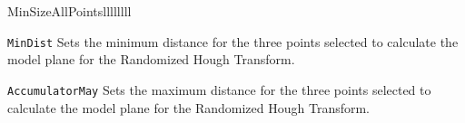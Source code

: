 \documentclass{InsightArticle}
\begin{document}
\begin{liste}{MinSizeAllPointsllllllll}
\item[\texttt{MinDist}] Sets the minimum distance for the three points
selected to calculate the model plane for the Randomized Hough Transform.
\item[\texttt{AccumulatorMay}] Sets the maximum distance for the three points
selected to calculate the model plane for the Randomized Hough Transform.

\end{liste}



% 
% 
\end{document}
